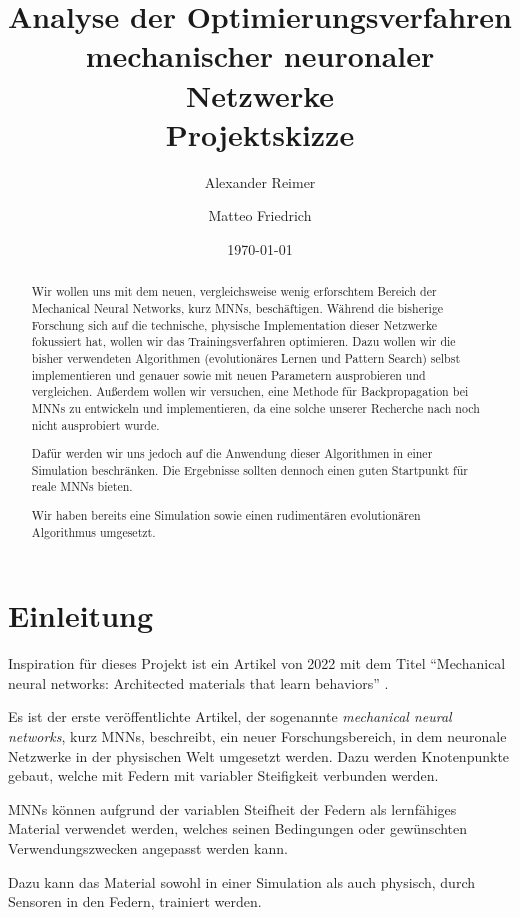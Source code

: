 \documentclass[parskip]{scrartcl}
\title{
    Analyse der Optimierungsverfahren mechanischer neuronaler Netzwerke \\ 
    \LARGE \normalfont Projektskizze
}
\author{Alexander Reimer \and Matteo Friedrich}
\date{\today}
\newcommand*{\eng}[1]{\textit{#1}}
\newcommand*{\feng}[1]{\eng{#1}}
\begin{document}
\maketitle

\tableofcontents

\begin{abstract}
    Wir wollen uns mit dem neuen, vergleichsweise wenig erforschtem Bereich der Mechanical Neural Networks, kurz MNNs, beschäftigen.
    Während die bisherige Forschung sich auf die technische, physische Implementation dieser Netzwerke fokussiert hat, wollen wir das Trainingsverfahren optimieren.
    Dazu wollen wir die bisher verwendeten Algorithmen (evolutionäres Lernen und Pattern Search) selbst implementieren und genauer sowie mit neuen Parametern ausprobieren und vergleichen.
    Außerdem wollen wir versuchen, eine Methode für Backpropagation bei MNNs zu entwickeln und implementieren, da eine solche unserer Recherche nach noch nicht ausprobiert wurde.

    Dafür werden wir uns jedoch auf die Anwendung dieser Algorithmen in einer Simulation beschränken. Die Ergebnisse sollten dennoch einen guten Startpunkt für reale MNNs bieten.

    Wir haben bereits eine Simulation sowie einen rudimentären evolutionären Algorithmus umgesetzt.
\end{abstract}

\section{Einleitung}

Inspiration für dieses Projekt ist ein Artikel von 2022 mit dem Titel \enquote{Mechanical neural networks: Architected materials that learn behaviors} \cite{Lee2022}.

Es ist der erste veröffentlichte Artikel, der sogenannte \feng{mechanical neural networks}, kurz MNNs, beschreibt, ein neuer Forschungsbereich, in dem neuronale Netzwerke in der physischen Welt umgesetzt werden.
Dazu werden Knotenpunkte gebaut, welche mit Federn mit variabler Steifigkeit verbunden werden.

MNNs können aufgrund der variablen Steifheit der Federn als lernfähiges Material verwendet werden, welches seinen Bedingungen oder gewünschten Verwendungszwecken angepasst werden kann.

Dazu kann das Material sowohl in einer Simulation als auch physisch, durch Sensoren in den Federn, trainiert werden.
\end{document}
